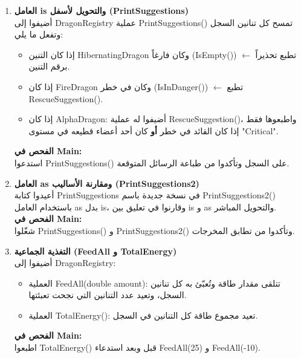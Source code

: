 \documentclass[14pt]{extarticle}
\begin{document}
\begin{enumerate}[label=\textbf{تمرين \arabic*:}, wide=0pt, leftmargin=*, itemsep=2.2em]
    \item \textbf{العامل \textenglish{is} والتحويل لأسفل (\textenglish{PrintSuggestions})} \\
    أضيفوا إلى \textenglish{DragonRegistry} عملية \textenglish{PrintSuggestions()} تمسح كل تنانين السجل وتفعل ما يلي:
    \begin{itemize}
        \item إذا كان التنين \textenglish{HibernatingDragon} وكان فارغاً (\textenglish{IsEmpty()}) $\leftarrow$ تطبع تحذيراً برقم التنين.
        \item إذا كان \textenglish{FireDragon} وكان في خطر (\textenglish{IsInDanger()}) $\leftarrow$ تطبع \textenglish{RescueSuggestion()}.
        \item إذا كان \textenglish{AlphaDragon}: أضيفوا له عملية \textenglish{RescueSuggestion()}، واطبعوها فقط إذا كان القائد في خطر \textbf{أو} كان أحد أعضاء قطيعه في مستوى \textenglish{"Critical"}.
    \end{itemize}
    \textbf{الفحص في \textenglish{Main}:} \\
    استدعوا \textenglish{PrintSuggestions()} على السجل وتأكدوا من طباعة الرسائل المتوقعة.

    \item \textbf{العامل \textenglish{as} ومقارنة الأساليب (\textenglish{PrintSuggestions2})} \\
    أعيدوا كتابة \textenglish{PrintSuggestions} في نسخة جديدة باسم \textenglish{PrintSuggestions2()} باستخدام العامل \textenglish{as} بدل \textenglish{is}، وقارنوا في تعليق بين \textenglish{is} و \textenglish{as} والتحويل المباشر. \\
    \textbf{الفحص في \textenglish{Main}:} \\
    شغّلوا \textenglish{PrintSuggestions()} و \textenglish{PrintSuggestions2()} وتأكدوا من تطابق المخرجات.

    \item \textbf{التغذية الجماعية (\textenglish{FeedAll} و \textenglish{TotalEnergy})} \\
    أضيفوا إلى \textenglish{DragonRegistry}:
    \begin{itemize}
        \item العملية \textenglish{FeedAll(double amount)}: تتلقى مقدار طاقة وتُعبّئ به كل تنانين السجل، وتعيد عدد التنانين التي نجحت تعبئتها.
        \item العملية \textenglish{TotalEnergy()}: تعيد مجموع طاقة كل التنانين في السجل.
    \end{itemize}
    \textbf{الفحص في \textenglish{Main}:} \\
    اطبعوا \textenglish{TotalEnergy()} قبل وبعد استدعاء \textenglish{FeedAll(25)} و \textenglish{FeedAll(-10)}.


\end{enumerate}
\end{document}
